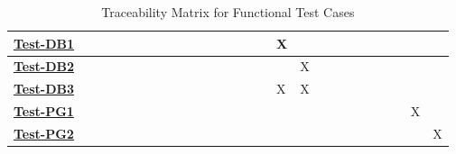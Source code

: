 \documentclass[12pt, titlepage]{article}
\begin{document}
\begin{landscape}
\begin{table}[H]
\begin{adjustwidth}{-0.0in}{-1in}
{\begin{tabular}{l|l|l|l|l|l|l|l|l|l|l|l|l|l|l|l|l|l|l|l|l|l|l|l|l|l|l|}
\multicolumn{1}{|l|}{\hyperref[Test-DB1]{\textbf{Test-DB1}}}  &              &              &              &              &              &              &              &              &              &               &               &               &               &               &               & X             &               &               &               &               &               &               &             &             &             &             \\ \hline
\multicolumn{1}{|l|}{\hyperref[Test-DB2]{\textbf{Test-DB2}}}  &              &              &              &              &              &              &              &              &              &               &               &               &               &               &               &               & X             &               &               &               &               &               &             &             &             &             \\ \hline
\multicolumn{1}{|l|}{\hyperref[Test-DB3]{\textbf{Test-DB3}}}  &              &              &              &              &              &              &              &              &              &               &               &               &               &               &               & X             & X             &               &               &               &               &               &             &             &             &             \\ \hline
\multicolumn{1}{|l|}{\hyperref[Test-PG1]{\textbf{Test-PG1}}}  &              &              &              &              &              &              &              &              &              &               &               &               &               &               &               &               &               &               &               &               &               &               &             &             & X           &             \\ \hline
\multicolumn{1}{|l|}{\hyperref[Test-PG2]{\textbf{Test-PG2}}}  &              &              &              &              &              &              &              &              &              &               &               &               &               &               &               &               &               &               &               &               &               &               &             &             &             & X           \\ \hline
\end{tabular}
}
\caption{Traceability Matrix for Functional Test Cases}
    \label{table:TMFR}
\end{adjustwidth}
\end{table}
\vfill
\raisebox{0.5pt}{\makebox[\linewidth]{\thepage}}
\end{landscape}
\end{document}
